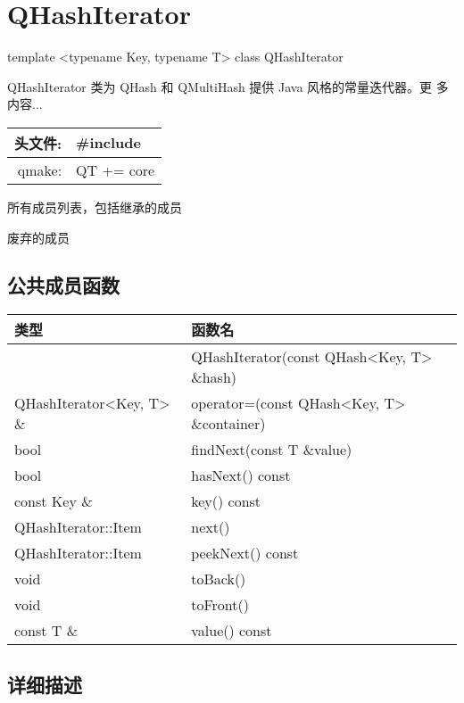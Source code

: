 \chapter{QHashIterator}

template <typename Key, typename T> class QHashIterator

QHashIterator 类为 QHash 和 QMultiHash 提供 Java 风格的常量迭代器。更
多内容...

\begin{tabular}{|r|l|}
	\hline
头文件: &	\#include\\
\hline
qmake: &	QT += core\\
	\hline
\end{tabular}

\begin{compactitem}[\arr]
\item 所有成员列表，包括继承的成员
\item 废弃的成员
\end{compactitem}

\splitLine

\section{公共成员函数}

\begin{tabular}{|l|l|}
\hline
类型	&函数名\\
\hline
 	& QHashIterator(const QHash<Key, T> \&hash)\\
\hline
QHashIterator<Key, T> \& &	operator=(const QHash<Key, T> \&container)\\
\hline
bool &	findNext(const T \&value)\\
\hline
bool &	hasNext() const\\
\hline
const Key \& &	key() const\\
\hline
QHashIterator::Item &	next()\\
\hline
QHashIterator::Item &	peekNext() const\\
\hline
void &	toBack()\\
\hline
void &	toFront()\\
\hline
const T \& 	&value() const\\
\hline
\end{tabular}

\splitLine

\section{详细描述}

